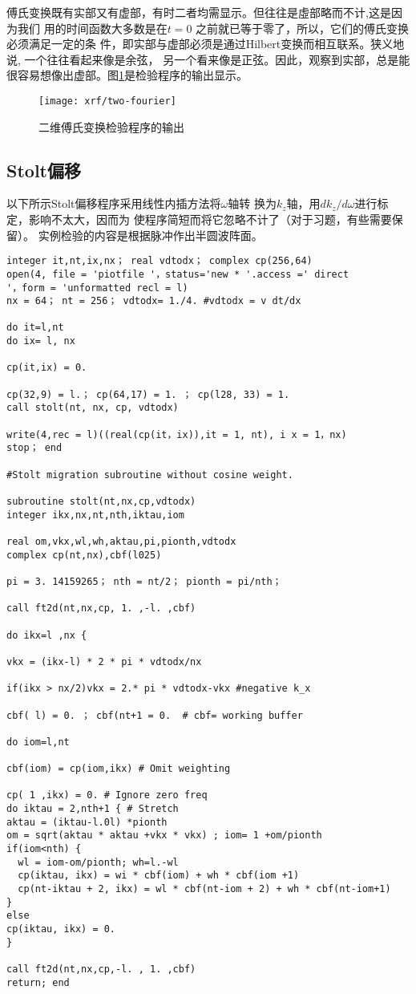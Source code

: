 傅氏变换既有实部又有虚部，有时二者均需显示。但往往是虛部略而不计,这是因为我们
用的时间函数大多数是在$t=0$
之前就已等于零了，所以，它们的傅氏变换必须满足一定的条
件，即实部与虚部必须是通过Hilbert变换而相互联系。狭义地说,
一个往往看起来像是余弦，
另一个看来像是正弦。因此，观察到实部，总是能
很容易想像出虚部。图\ref{fig:xrf/two-fourier}是检验程序的输出显示。
\begin{figure}[H]
\centering
\texttt{[image: xrf/two-fourier]}
\caption[two-fourier]{二维傅氏变换检验程序的输出}
\label{fig:xrf/two-fourier}
\end{figure}
\subsection{Stolt偏移}
以下所示Stolt偏移程序采用线性内插方法将$\omega$轴转
换为$k_z$轴，用$dk_z/d\omega$进行标定，影响不太大，因而为
使程序简短而将它忽略不计了（对于习题，有些需要保留）。
实例检验的内容是根据脉冲作出半圆波阵面。
\begin{verbatim}
integer it,nt,ix,nx； real vdtodx； complex cp(256,64)
open(4, file = 'piotfile '，status='new * '.access =' direct
'，form = 'unformatted recl = l)
nx = 64； nt = 256； vdtodx= 1./4. #vdtodx = v dt/dx

do it=l,nt
do ix= l, nx

cp(it,ix) = 0.

cp(32,9) = l.； cp(64,17) = 1. ； cp(l28, 33) = 1. 
call stolt(nt, nx, cp, vdtodx)

write(4,rec = l)((real(cp(it，ix)),it = 1, nt), i x = 1，nx)
stop； end

#Stolt migration subroutine without cosine weight.

subroutine stolt(nt,nx,cp,vdtodx)
integer ikx,nx,nt,nth,iktau,iom

real om,vkx,wl,wh,aktau,pi,pionth,vdtodx
complex cp(nt,nx),cbf(l025)

pi = 3. 14159265； nth = nt/2； pionth = pi/nth；

call ft2d(nt,nx,cp, 1. ,-l. ,cbf)

do ikx=l ,nx {

vkx = (ikx-l) * 2 * pi * vdtodx/nx

if(ikx > nx/2)vkx = 2.* pi * vdtodx-vkx #negative k_x

cbf( l) = 0. ； cbf(nt+1 = 0.  # cbf= working buffer

do iom=l,nt

cbf(iom) = cp(iom,ikx) # Omit weighting

cp( 1 ,ikx) = 0. # Ignore zero freq
do iktau = 2,nth+1 { # Stretch
aktau = (iktau-l.0l) *pionth
om = sqrt(aktau * aktau +vkx * vkx) ; iom= 1 +om/pionth
if(iom<nth) {
  wl = iom-om/pionth; wh=l.-wl
  cp(iktau, ikx) = wi * cbf(iom) + wh * cbf(iom +1)
  cp(nt-iktau + 2, ikx) = wl * cbf(nt-iom + 2) + wh * cbf(nt-iom+1)
}
else
cp(iktau, ikx) = 0.
}

call ft2d(nt,nx,cp,-l. , 1. ,cbf) 
return; end
\end{verbatim}
